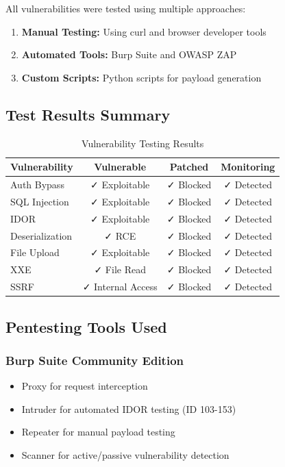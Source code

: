 \documentclass[12pt,a4paper]{article}
\begin{document}
All vulnerabilities were tested using multiple approaches:
\begin{enumerate}[leftmargin=*]
    \item \textbf{Manual Testing:} Using curl and browser developer tools
    \item \textbf{Automated Tools:} Burp Suite and OWASP ZAP
    \item \textbf{Custom Scripts:} Python scripts for payload generation
\end{enumerate}

\subsection{Test Results Summary}

\begin{table}[h]
\centering
\begin{tabular}{|l|c|c|c|}
\hline
\textbf{Vulnerability} & \textbf{Vulnerable} & \textbf{Patched} & \textbf{Monitoring} \\
\hline
Auth Bypass & ✓ Exploitable & ✓ Blocked & ✓ Detected \\
\hline
SQL Injection & ✓ Exploitable & ✓ Blocked & ✓ Detected \\
\hline
IDOR & ✓ Exploitable & ✓ Blocked & ✓ Detected \\
\hline
Deserialization & ✓ RCE & ✓ Blocked & ✓ Detected \\
\hline
File Upload & ✓ Exploitable & ✓ Blocked & ✓ Detected \\
\hline
XXE & ✓ File Read & ✓ Blocked & ✓ Detected \\
\hline
SSRF & ✓ Internal Access & ✓ Blocked & ✓ Detected \\
\hline
\end{tabular}
\caption{Vulnerability Testing Results}
\end{table}

\subsection{Pentesting Tools Used}

\subsubsection{Burp Suite Community Edition}
\begin{itemize}[leftmargin=*]
    \item Proxy for request interception
    \item Intruder for automated IDOR testing (ID 103-153)
    \item Repeater for manual payload testing
    \item Scanner for active/passive vulnerability detection
\end{itemize}
\end{document}
